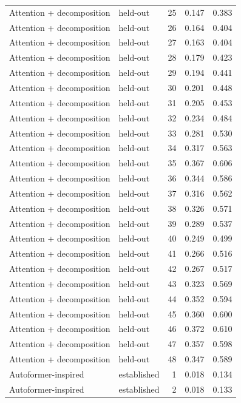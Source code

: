 \begin{tabular}{llrrr}
Attention + decomposition & held-out & 25 & 0.147 & 0.383 \\
Attention + decomposition & held-out & 26 & 0.164 & 0.404 \\
Attention + decomposition & held-out & 27 & 0.163 & 0.404 \\
Attention + decomposition & held-out & 28 & 0.179 & 0.423 \\
Attention + decomposition & held-out & 29 & 0.194 & 0.441 \\
Attention + decomposition & held-out & 30 & 0.201 & 0.448 \\
Attention + decomposition & held-out & 31 & 0.205 & 0.453 \\
Attention + decomposition & held-out & 32 & 0.234 & 0.484 \\
Attention + decomposition & held-out & 33 & 0.281 & 0.530 \\
Attention + decomposition & held-out & 34 & 0.317 & 0.563 \\
Attention + decomposition & held-out & 35 & 0.367 & 0.606 \\
Attention + decomposition & held-out & 36 & 0.344 & 0.586 \\
Attention + decomposition & held-out & 37 & 0.316 & 0.562 \\
Attention + decomposition & held-out & 38 & 0.326 & 0.571 \\
Attention + decomposition & held-out & 39 & 0.289 & 0.537 \\
Attention + decomposition & held-out & 40 & 0.249 & 0.499 \\
Attention + decomposition & held-out & 41 & 0.266 & 0.516 \\
Attention + decomposition & held-out & 42 & 0.267 & 0.517 \\
Attention + decomposition & held-out & 43 & 0.323 & 0.569 \\
Attention + decomposition & held-out & 44 & 0.352 & 0.594 \\
Attention + decomposition & held-out & 45 & 0.360 & 0.600 \\
Attention + decomposition & held-out & 46 & 0.372 & 0.610 \\
Attention + decomposition & held-out & 47 & 0.357 & 0.598 \\
Attention + decomposition & held-out & 48 & 0.347 & 0.589 \\
Autoformer-inspired & established & 1 & 0.018 & 0.134 \\
Autoformer-inspired & established & 2 & 0.018 & 0.133 \\

\end{tabular}
